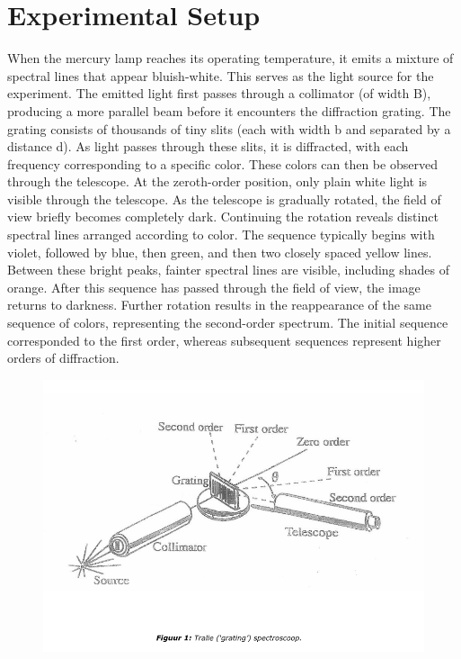 \section{Experimental Setup}

    When the mercury lamp reaches its operating temperature, it emits a mixture of spectral lines that appear bluish-white. This serves as the light source for the experiment.
\newline
    The emitted light first passes through a collimator (of width B), producing a more parallel beam before it encounters the diffraction grating. The grating consists of thousands of tiny slits (each with width b and separated by a distance d). As light passes through these slits, it is diffracted, with each frequency corresponding to a specific color. These colors can then be observed through the telescope.
\newline
\newline
    At the zeroth-order position, only plain white light is visible through the telescope. As the telescope is gradually rotated, the field of view briefly becomes completely dark. Continuing the rotation reveals distinct spectral lines arranged according to color. The sequence typically begins with violet, followed by blue, then green, and then two closely spaced yellow lines. Between these bright peaks, fainter spectral lines are visible, including shades of orange.
\newline
    After this sequence has passed through the field of view, the image returns to darkness. Further rotation results in the reappearance of the same sequence of colors, representing the second-order spectrum. The initial sequence corresponded to the first order, whereas subsequent sequences represent higher orders of diffraction.
\newline
\begin{figure} [h]
    \centering
    \includegraphics[width=1\linewidth]{afbeelding.png}
    \label{fig:enter-label}
\end{figure}